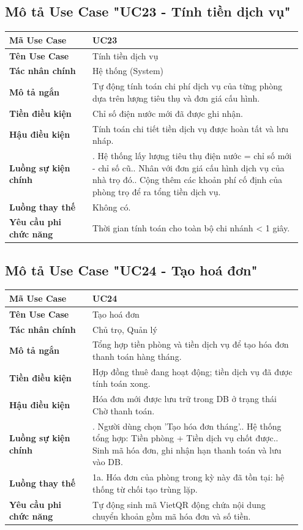 \subsection{Mô tả Use Case "UC23 - Tính tiền dịch vụ"}

\begin{longtable}[]{@{}>{\RaggedRight\arraybackslash}p{0.27\linewidth}>{\RaggedRight\arraybackslash}p{0.68\linewidth}@{}}
\toprule
\textbf{Mã Use Case} & UC23\tabularnewline
\midrule
\endhead
\textbf{Tên Use Case} & Tính tiền dịch vụ\tabularnewline
\textbf{Tác nhân chính} & Hệ thống (System)\tabularnewline
\textbf{Mô tả ngắn} & Tự động tính toán chi phí dịch vụ của từng phòng
dựa trên lượng tiêu thụ và đơn giá cấu hình.\tabularnewline
\textbf{Tiền điều kiện} & Chỉ số điện nước mới đã được ghi
nhận.\tabularnewline
\textbf{Hậu điều kiện} & Tính toán chi tiết tiền dịch vụ được hoàn tất
và lưu nháp.\tabularnewline
\textbf{Luồng sự kiện chính} & 1. Hệ thống lấy lượng
tiêu thụ điện nước = chỉ số mới - chỉ số cũ.\newline 2. Nhân với
đơn giá cấu hình dịch vụ của nhà trọ đó.\newline 3. Cộng thêm các
khoản phí cố định của phòng trọ để ra tổng tiền dịch
vụ.\tabularnewline
\textbf{Luồng thay thế} & Không có.\tabularnewline
\textbf{Yêu cầu phi chức năng} & Thời gian tính toán cho toàn bộ chi
nhánh \textless{} 1 giây.\tabularnewline
\bottomrule
\end{longtable}

\subsection{Mô tả Use Case "UC24 - Tạo hoá đơn"}

\begin{longtable}[]{@{}>{\RaggedRight\arraybackslash}p{0.27\linewidth}>{\RaggedRight\arraybackslash}p{0.68\linewidth}@{}}
\toprule
\textbf{Mã Use Case} & UC24\tabularnewline
\midrule
\endhead
\textbf{Tên Use Case} & Tạo hoá đơn\tabularnewline
\textbf{Tác nhân chính} & Chủ trọ, Quản lý\tabularnewline
\textbf{Mô tả ngắn} & Tổng hợp tiền phòng và tiền dịch vụ để tạo hóa đơn
thanh toán hàng tháng.\tabularnewline
\textbf{Tiền điều kiện} & Hợp đồng thuê đang hoạt động; tiền dịch vụ đã
được tính toán xong.\tabularnewline
\textbf{Hậu điều kiện} & Hóa đơn mới được lưu trữ trong DB ở trạng thái
Chờ thanh toán.\tabularnewline
\textbf{Luồng sự kiện chính} & 1. Người dùng chọn
'Tạo hóa đơn tháng'.\newline 2. Hệ thống tổng hợp: Tiền phòng +
Tiền dịch vụ chốt được.\newline 3. Sinh mã hóa đơn, ghi nhận hạn
thanh toán và lưu vào DB.\tabularnewline
\textbf{Luồng thay thế} & 1a. Hóa đơn của phòng trong kỳ này đã tồn tại:
hệ thống từ chối tạo trùng lặp.\tabularnewline
\textbf{Yêu cầu phi chức năng} & Tự động sinh mã VietQR động chứa nội
dung chuyển khoản gồm mã hóa đơn và số tiền.\tabularnewline
\bottomrule
\end{longtable}

